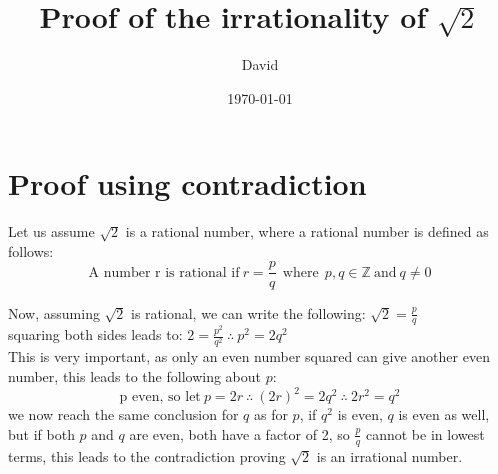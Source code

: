\documentclass{article}
\title{Proof of the irrationality of $\sqrt{2}$}
\author{David}
\date{\today}
\begin{document}
\maketitle
\section{Proof using contradiction}
Let us assume $\sqrt{2}$ is a rational number, where a rational number is defined as follows:\\
\begin{equation}
    \text{A number r is rational if} \ r=\frac{p}{q} \ \ \text{where} \ \ p,q \in \mathbb{Z} \ \text{and} \ q \neq 0 
\end{equation}

Now, assuming $\sqrt{2}$ is rational, we can write the following: $\sqrt{2}=\frac{p}{q}$\\
squaring both sides leads to: $2=\frac{p^2}{q^2} \ \therefore \ p^2=2q^2$\\

This is very important, as only an even number squared can give another even number, this leads to the following about $p$:\\
\begin{equation}
    \text{p even, so let} \ p=2r \ \therefore \ (2r)^2 =2q^2 \ \therefore \ 2r^2=q^2
\end{equation}
we now reach the same conclusion for $q$ as for $p$, if $q^2$ is even, $q$ is even as well,\\
but if both $p$ and $q$ are even, both have a factor of 2, so $\frac{p}{q}$ cannot be in lowest terms, 
this leads to the contradiction proving $\sqrt{2}$ is an irrational number.
\end{document}
